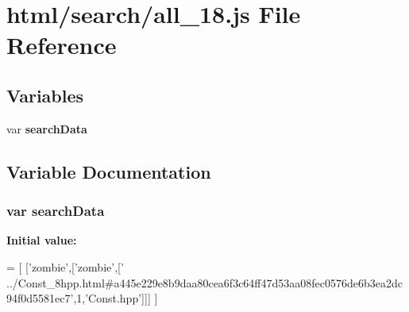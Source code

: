 \section{html/search/all\-\_\-18.js File Reference}
\label{all__18_8js}
\subsection*{Variables}
\begin{DoxyCompactItemize}
\item 
var {\bf search\-Data}
\end{DoxyCompactItemize}


\subsection{Variable Documentation}
\subsubsection[{search\-Data}]{\setlength{\rightskip}{0pt plus 5cm}var search\-Data}\label{all__18_8js_ad01a7523f103d6242ef9b0451861231e}
{\bfseries Initial value\-:}
\begin{DoxyCode}
=
[
  [\textcolor{stringliteral}{'zombie'},[\textcolor{stringliteral}{'zombie'},[\textcolor{stringliteral}{'
      ../Const\_8hpp.html#a445e229e8b9daa80cea6f3c64ff47d53aa08fec0576de6b3ea2dc94f0d5581ec7'},1,\textcolor{stringliteral}{'Const.hpp'}]]]
]
\end{DoxyCode}
